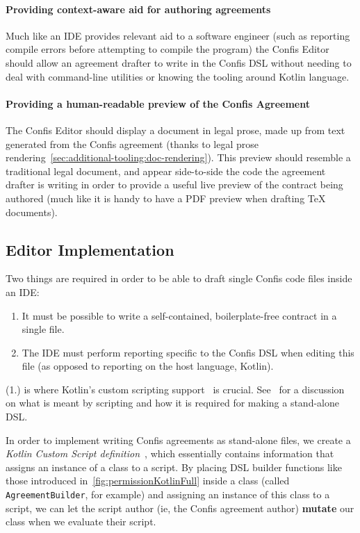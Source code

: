 \paragraph{Providing context-aware aid for authoring agreements} Much like an IDE provides relevant aid to a software engineer (such as reporting compile errors before attempting to compile the program) the Confis Editor should allow an agreement drafter to write in the Confis DSL without needing to deal with command-line utilities or knowing the tooling around Kotlin language.

\paragraph{Providing a human-readable preview of the Confis Agreement}

The Confis Editor should display a document in legal prose, made up from text generated from the Confis agreement (thanks to legal prose rendering~\ref{sec:additional-tooling:doc-rendering}).
This preview should resemble a traditional legal document, and appear side-to-side the code the agreement drafter is writing in order to provide a useful live preview of the contract being authored (much like it is handy to have a PDF preview when drafting TeX documents).

\subsection{Editor Implementation}\label{subsec:editor-implementation}

Two things are required in order to be able to draft single Confis code files inside an IDE:
\begin{enumerate}
    \item It must be possible to write a self-contained, boilerplate-free contract in a single file.
    \item The IDE must perform reporting specific to the Confis DSL when editing this file (as opposed to reporting on the host language, Kotlin).
\end{enumerate}

(1.) is where Kotlin's custom scripting support~\cite{kotlinScriptKeep} is crucial.
See~ for a discussion on what is meant by scripting and how it is required for making a stand-alone DSL.

In order to implement writing Confis agreements as stand-alone files, we create a \emph{Kotlin Custom Script definition}~\cite{kotlinScriptKeep}, which essentially contains information that assigns an instance of a class to a script.
By placing DSL builder functions like those introduced in~\autoref{fig:permissionKotlinFull} inside a class (called \texttt{AgreementBuilder}, for example) and assigning an instance of this class to a script, we can let the script author (ie, the Confis agreement author) \textbf{mutate} our class when we evaluate their script.

